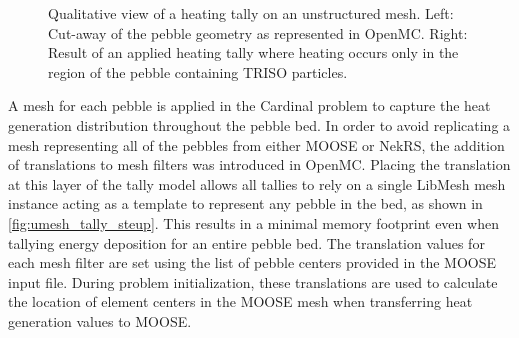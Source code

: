 \begin{figure}
    \centering
    \hspace*{.2in}
    \caption{Qualitative view of a heating tally on an unstructured mesh. Left: Cut-away of the pebble geometry as represented in OpenMC. Right: Result of an applied heating tally where heating occurs only in the region of the pebble containing TRISO particles.}
    \label{fig:pebble_umesh}
\end{figure}

A mesh for each pebble is applied in the Cardinal problem to capture the heat generation distribution throughout the pebble bed. In order to avoid replicating a mesh representing all of the pebbles from either MOOSE or NekRS, the addition of translations to mesh filters was introduced in OpenMC. Placing the translation at this layer of the tally model allows all tallies to rely on a single LibMesh mesh instance acting as a template to represent any pebble in the bed, as shown in \autoref{fig:umesh_tally_steup}. This results in a minimal memory footprint even when tallying energy deposition for an entire pebble bed. The translation values for each mesh filter are set using the list of pebble centers provided in the MOOSE input file. During problem initialization, these translations are used to calculate the location of element centers in the MOOSE mesh when transferring heat generation values to MOOSE.


